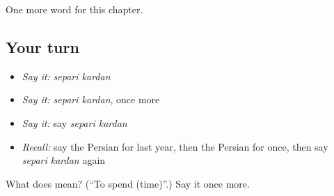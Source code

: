 \begin{grammarlens}[title={What you've built}]
One more word for this chapter.
\end{grammarlens}

\subsection*{Your turn}
\begin{itemize}
\raggedright
  \item \emph{Say it:} \emph{separi kardan}
  \item \emph{Say it:} \emph{separi kardan}, once more
  \item \emph{Say it:} say \emph{separi kardan}
  \item \emph{Recall:} say the Persian for last year, then the Persian for once, then say \emph{separi kardan} again
\end{itemize}

\begin{tcolorbox}[breakable,colback=teal!4,colframe=teal!35!black,title={Before you move on}]
What does   mean? (\textquotedblleft{}To spend (time)\textquotedblright{}.) Say it once more.
\end{tcolorbox}
